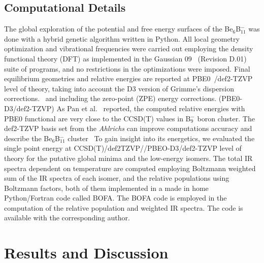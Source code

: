 \documentclass[prb,aps,preprint,showkeys,showpacs]{revtex4}
\begin{document}
\subsection{Computational Details}
The global exploration of the potential and free energy surfaces of the Be$_6$B${^{-}_{11}}$ was done with a hybrid genetic algorithm written in Python. All local geometry optimization and vibrational frequencies were carried out employing the density functional theory (DFT) as implemented in the Gaussian 09~\cite{gauss} (Revision D.01) suite of programs, and no restrictions in the optimizations were imposed. Final equilibrium geometries and relative energies are reported at PBE0~\cite{Adamo}/def2-TZVP~\cite{Weigend} level of theory, taking into account the D3 version of Grimme’s dispersion corrections.~\cite{Grimme} and including the zero-point (ZPE) energy corrections. (PBE0-D3/def2-TZVP) As Pan et al.~\cite{Li-Li} reported, the computed relative energies with PBE0 functional are very close to the CCSD(T) values in  B$_9^{-}$ boron cluster. The def2-TZVP basis set from the \emph{Ahlrichs} can improve computations accuracy and describe the Be$_6$B${^{-}_{11}}$ cluster~\cite{Guo} To gain insight into its energetics, we evaluated the single point energy at CCSD(T)/def2TZVP//PBEO-D3/def2-TZVP level of theory for the putative global minima and the low-energy isomers. The total IR spectra dependent on temperature are computed employing Boltzmann weighted sum of the IR spectra of each isomer, and the relative populations using Boltzmann factors, both of them implemented in a made in home Python/Fortran code called BOFA. The BOFA code is employed in the computation of the relative population and weighted IR spectra. The code is available with the corresponding author.
\section{Results and Discussion}
\end{document}
